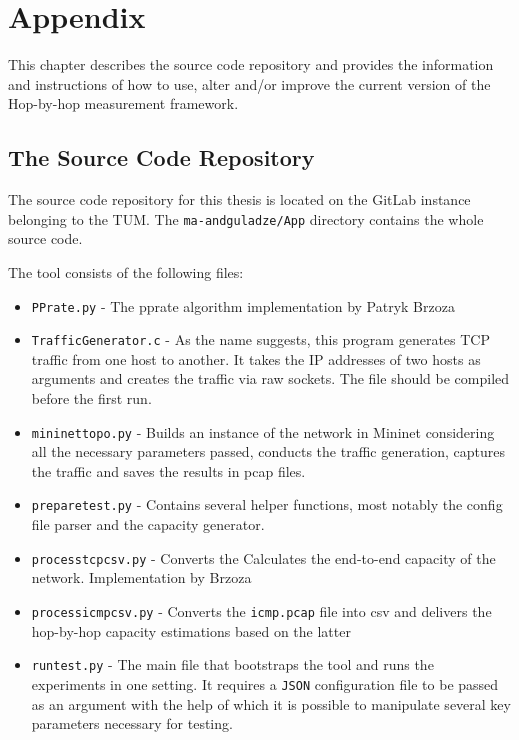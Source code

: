 \chapter{Appendix}
This chapter describes the source code repository and provides the information and  instructions of how to use, alter and/or improve the current version of the Hop-by-hop measurement framework. 

\section{The Source Code Repository}
The source code repository for this thesis is located on the GitLab instance belonging to the TUM. The \texttt{ma-andguladze/App} directory contains the whole source code.

The tool consists of the following files:
\begin{itemize}
  \item \texttt{PPrate.py} - The pprate algorithm implementation by Patryk Brzoza\cite{Brzoza}
  \item \texttt{TrafficGenerator.c} - As the name suggests, this program generates TCP traffic from one host to another. It takes the IP addresses of two hosts as arguments and creates the traffic via raw sockets. The file should be compiled before the first run.
  \item \texttt{mininet\textunderscore topo.py} - Builds an instance of the network in Mininet considering all the necessary parameters passed, conducts the traffic generation, captures the traffic and saves the results in pcap files.
  \item \texttt{prepare\textunderscore test.py} - Contains several helper functions, most notably the config file parser and the capacity generator.
  \item \texttt{process\textunderscore tcp\textunderscore csv.py} - Converts the Calculates the end-to-end capacity of the network. Implementation by Brzoza\cite{Brzoza}
  \item \texttt{process\textunderscore icmp\textunderscore csv.py} - Converts the \texttt{icmp.pcap} file into csv and delivers the hop-by-hop capacity estimations based on the latter 
  \item \texttt{run\textunderscore test.py} - The main file that bootstraps the tool and runs the experiments in one setting. It requires a \texttt{JSON} configuration file to be passed as an argument with the help of which it is possible to manipulate several key parameters necessary for testing.
\end{itemize}

